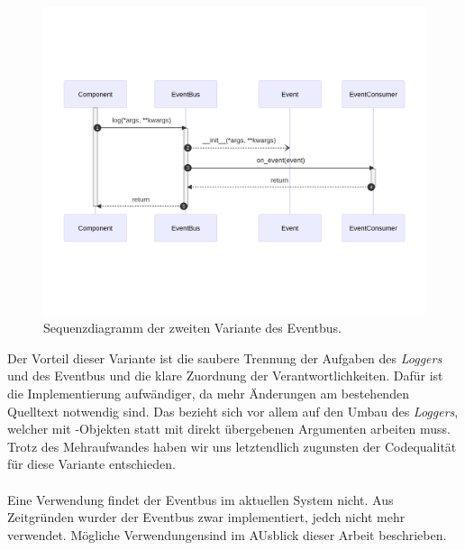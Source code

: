 \begin{figure}[H]
	\centering
	\includegraphics[width=1.0\linewidth]{images/diagrams/eventbus-v2-seq.png}
	\caption{Sequenzdiagramm der zweiten Variante des Eventbus.}
	\label{fig:eventbus-v2-seq}
\end{figure}

Der Vorteil dieser Variante ist die saubere Trennung der Aufgaben des \emph{Loggers} und des Eventbus und die klare Zuordnung der Verantwortlichkeiten. Dafür ist die Implementierung aufwändiger, da mehr Änderungen am bestehenden Quelltext notwendig sind. Das bezieht sich vor allem auf den Umbau des \emph{Loggers}, welcher mit -Objekten statt mit direkt übergebenen Argumenten arbeiten muss. Trotz des Mehraufwandes haben wir uns letztendlich zugunsten der Codequalität für diese Variante entschieden.\\
\\
Eine Verwendung findet der Eventbus im aktuellen System nicht. Aus Zeitgründen wurder der Eventbus zwar implementiert, jedch nicht mehr verwendet. Mögliche Verwendungensind im AUsblick dieser Arbeit beschrieben.